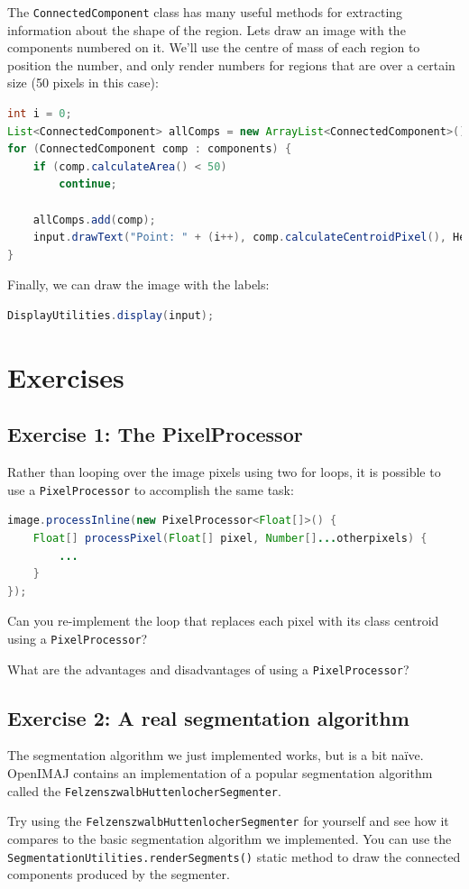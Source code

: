 \documentclass[10pt,a4paper,twoside,extrafontsizes]{memoir}
\begin{document}
The \verb+ConnectedComponent+ class has many useful methods for extracting information 
about the shape of the region. Lets draw an image with the components numbered on it. We'll use the 
centre of mass of each region to position the number, and only render numbers for regions that 
are over a certain size (50 pixels in this case):
\begin{lstlisting}[language=java]
int i = 0;
List<ConnectedComponent> allComps = new ArrayList<ConnectedComponent>();
for (ConnectedComponent comp : components) {
    if (comp.calculateArea() < 50) 
        continue;

    allComps.add(comp);
    input.drawText("Point: " + (i++), comp.calculateCentroidPixel(), HersheyFont.TIMES_MEDIUM,20);
}
\end{lstlisting}
Finally, we can draw the image with the labels:
\begin{lstlisting}[language=java]
DisplayUtilities.display(input);
\end{lstlisting}

\pagebreak
\section*{Exercises}
\subsection*{Exercise 1: The PixelProcessor}
Rather than looping over the image pixels using two for loops, it is possible to use a 
\verb+PixelProcessor+ to accomplish the same task:
\begin{lstlisting}[language=java]
image.processInline(new PixelProcessor<Float[]>() {
    Float[] processPixel(Float[] pixel, Number[]...otherpixels) {
        ...
    }
});
\end{lstlisting}
Can you re-implement the loop that replaces each pixel with its class centroid 
using a \verb+PixelProcessor+? 

What are the advantages and disadvantages of using a \verb+PixelProcessor+?

\subsection*{Exercise 2: A real segmentation algorithm}
The segmentation algorithm we just implemented works, but is a bit na\"ive. OpenIMAJ contains an 
implementation of a popular segmentation algorithm called the \verb+FelzenszwalbHuttenlocherSegmenter+. 

Try using the \verb+FelzenszwalbHuttenlocherSegmenter+ for yourself and see how it compares to the 
basic segmentation algorithm we implemented. You can use the \verb+SegmentationUtilities.renderSegments()+ 
static method to draw the connected components produced by the segmenter.
\end{document}
